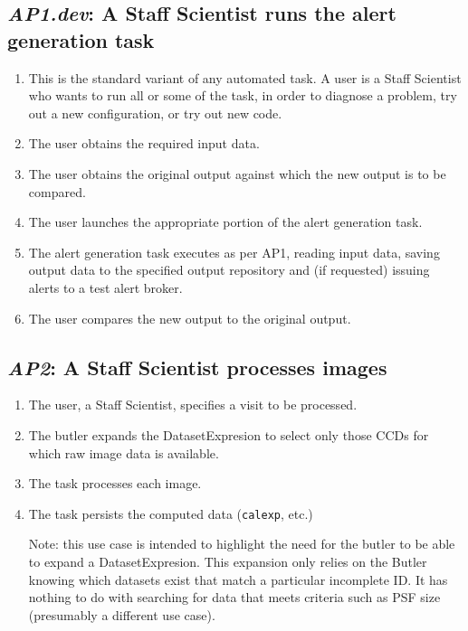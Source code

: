 \documentclass[DM,toc,lsstdraft]{lsstdoc}
\newcommand{\usecase}[3]{%
\subsection{\emph{#1}: #2}
\label{use:#1}
\begin{enumerate}[label=\alph*.]
#3
\end{enumerate}
}
\begin{document}
\usecase{AP1.dev}{A Staff Scientist runs the alert generation task}{%

\item
This is the standard variant of any automated task.
A user is a Staff Scientist who wants to run all or some of the task, in order to diagnose a problem, try out a new configuration, or try out new code.

\item
The user obtains the required input data.

\item
The user obtains the original output against which the new output is to be compared.

\item
The user launches the appropriate portion of the alert generation task.

\item
The alert generation task executes as per AP1, reading input data, saving output data to the specified output repository and (if requested) issuing alerts to a test alert broker.

\item
The user compares the new output to the original output.

}

\usecase{AP2}{A Staff Scientist processes images}{%

\item
The user, a Staff Scientist, specifies a visit to be processed.

\item
The butler expands the DatasetExpresion to select only those CCDs for which raw image data is available.

\item
The task processes each image.

\item
The task persists the computed data (\texttt{calexp}, etc.)

Note: this use case is intended to highlight the need for the butler to be able to expand a DatasetExpresion.
This expansion only relies on the Butler knowing which datasets exist that match a particular incomplete ID.
It has nothing to do with searching for data that meets criteria such as PSF size (presumably a different use case).

}
\end{document}
